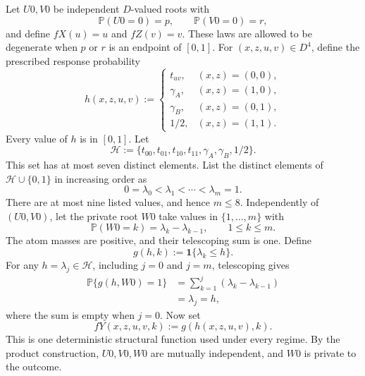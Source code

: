 Let \(U0,V0\) be independent \(D\)-valued roots with
\[
\mathbb P(U0=0)=p,
\qquad
\mathbb P(V0=0)=r,
\]
and define \(fX(u)=u\) and \(fZ(v)=v\).  These laws are allowed to be degenerate when \(p\) or \(r\) is an endpoint of \([0,1]\).  For \((x,z,u,v)\in D^4\), define the prescribed response probability
\[
h(x,z,u,v):=
\begin{cases}
t_{uv},&(x,z)=(0,0),\\
\gamma_A,&(x,z)=(1,0),\\
\gamma_B,&(x,z)=(0,1),\\
1/2,&(x,z)=(1,1).
\end{cases}
\]
Every value of \(h\) is in \([0,1]\).  Let
\[
\mathcal H:=\{t_{00},t_{01},t_{10},t_{11},\gamma_A,\gamma_B,1/2\}.
\]
This set has at most seven distinct elements.  List the distinct elements of \(\mathcal H\cup\{0,1\}\) in increasing order as
\[
0=\lambda_0<\lambda_1<\cdots<\lambda_m=1.
\]
There are at most nine listed values, and hence \(m\le8\).  Independently of \((U0,V0)\), let the private root \(W0\) take values in \(\{1,\ldots,m\}\) with
\[
\mathbb P(W0=k)=\lambda_k-\lambda_{k-1},
\qquad 1\le k\le m.
\]
The atom masses are positive, and their telescoping sum is one.  Define
\[
g(h,k):=\mathbf 1\{\lambda_k\le h\}.
\]
For any \(h=\lambda_j\in\mathcal H\), including \(j=0\) and \(j=m\), telescoping gives
\[
\begin{aligned}
\mathbb P\{g(h,W0)=1\}
&=\sum_{k=1}^{j}(\lambda_k-\lambda_{k-1})\\
&=\lambda_j=h,
\end{aligned}
\]
where the sum is empty when \(j=0\).  Now set
\[
fY(x,z,u,v,k):=g(h(x,z,u,v),k).
\]
This is one deterministic structural function used under every regime.  By the product construction, \(U0,V0,W0\) are mutually independent, and \(W0\) is private to the outcome.

